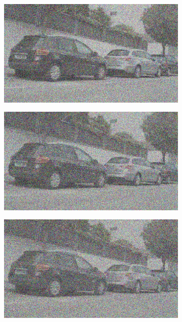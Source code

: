 \documentclass[a4paper]{ctexart}
\begin{document}
\begin{figure}[htbp]
\begin{subfigure}{0.08\textwidth}
			\label{fig：Gamma=1.0, Gauss Noise = 0.7}
		\end{subfigure}
		\begin{subfigure}{0.08\textwidth}
			\captionsetup{font=scriptsize}
			\includegraphics[width=\linewidth]{picture/Edge Detection/degrade/RGB_001 Gamma=1.0, Gauss Noise=0.8}
			\label{fig：Gamma=1.0, Gauss Noise = 0.8}
		\end{subfigure}
		\begin{subfigure}{0.08\textwidth}
			\captionsetup{font=scriptsize}
			\includegraphics[width=\linewidth]{picture/Edge Detection/degrade/RGB_001 Gamma=1.0, Gauss Noise=0.9}
			\label{fig：Gamma=1.0, Gauss Noise = 0.9}
		\end{subfigure}
		\begin{subfigure}{0.08\textwidth}
			\captionsetup{font=scriptsize}
			\includegraphics[width=\linewidth]{picture/Edge Detection/degrade/RGB_001 Gamma=1.0, Gauss Noise=1.0}

\end{subfigure}
\end{figure}
\end{document}
